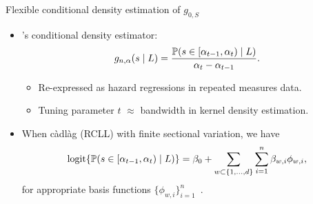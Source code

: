 \documentclass{beamer}
\begin{document}

\begin{frame}[c]{Flexible conditional density estimation of $g_{0,S}$}

\begin{center}
\begin{itemize}
  \itemsep8pt
  \item \cite{diaz2011super}'s conditional density estimator:
    \begin{equation*}
      g_{n, \alpha}(s \mid L) = \frac{\mathbb{P} (s \in [\alpha_{t-1}, \alpha_t)
        \mid L)}{\alpha_t - \alpha_{t-1}}.
    \end{equation*}
    \vspace{-0.5em}
    \begin{itemize}
      \itemsep4pt
      \item Re-expressed as hazard regressions in repeated measures data.
      \item Tuning parameter $t$ $\approx$ bandwidth in kernel density
        estimation.
    \end{itemize}
  \item When c\`{a}dl\`{a}g (RCLL) with finite sectional variation, we have
    {\small{
    \begin{equation*}
     \operatorname{logit} \{\mathbb{P}(s \in [\alpha_{t-1}, \alpha_t) \mid L)\} = \beta_0 +
       \sum_{w \subset\{1,\ldots,d\}} \sum_{i=1}^{n} \beta_{w,i} \phi_{w,i},
    \end{equation*} }
    }
    for appropriate basis functions
    $\{ \phi_{w,i} \}_{i=1}^n$~\citep{gill1995inefficient}.
\end{itemize}
\end{center}

\note{
}

\end{frame}

\end{document}
